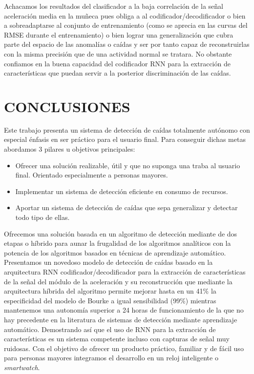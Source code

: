 \documentclass[11pt,a4paper,spanish,twocolumn]{article}
\begin{document}
Achacamos los resultados del clasificador a la baja correlación de la señal aceleración media en la muñeca pues obliga a al codificador/decodificador o bien a sobreadaptarse al conjunto de entrenamiento (como se aprecia en las curvas del RMSE durante el entrenamiento) o bien lograr una generalización que cubra parte del espacio de las anomalías o caídas y ser por tanto capaz de reconstruirlas con la misma precisión que de una actividad normal se tratara. No obstante confiamos en la buena capacidad del codificador RNN para la extracción de características que puedan servir a la posterior discriminación de las caídas. 


\section{CONCLUSIONES}
Este trabajo presenta un sistema de detección de caídas totalmente autónomo con especial énfasis en ser práctico para el usuario final. Para conseguir dichas metas abordamos 3 pilares u objetivos principales:

\begin{itemize}
	\item Ofrecer una solución realizable, útil y que no suponga una traba al usuario final. Orientado especialmente a personas mayores.
	\item Implementar un sistema de detección eficiente en consumo de recursos.
	\item Aportar un sistema de detección de caídas que sepa generalizar y detectar todo tipo de ellas.
\end{itemize}

Ofrecemos una solución basada en un algoritmo de detección mediante de dos etapas o híbrido para aunar la frugalidad de los algoritmos analíticos con la potencia de los algoritmos basados en técnicas de aprendizaje automático. Presentamos un novedoso modelo de detección de caídas basado en la arquitectura RNN codificador/decodificador para la extracción de características de la señal del módulo de la aceleración y su reconstrucción que mediante la arquitectura híbrida del algoritmo permite mejorar hasta en un 41\% la especificidad del modelo de Bourke a igual sensibilidad (99\%) mientras mantenemos una autonomía superior a 24 horas de funcionamiento de la que no hay precedente en la literatura de sistemas de detección mediante aprendizaje automático. Demostrando así que el uso de RNN para la extracción de características es un sistema competente incluso con capturas de señal muy ruidosas. Con el objetivo de ofrecer un producto práctico, familiar y de fácil uso para personas mayores integramos el desarrollo en un reloj inteligente o \textit{smartwatch}.
\end{document}
